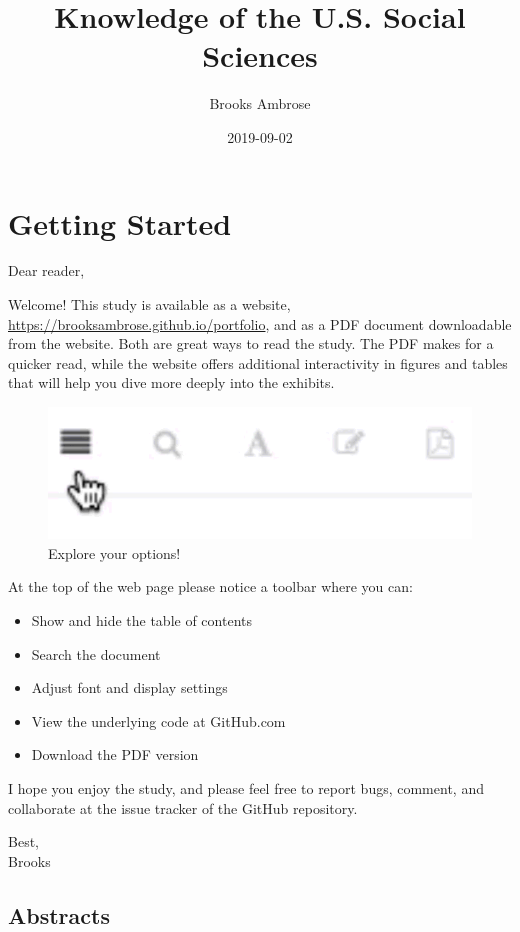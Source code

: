 \documentclass[]{book}
\title{Knowledge of the U.S. Social Sciences}
\author{Brooks Ambrose}
\date{2019-09-02}
\providecommand{\tightlist}{%
  \setlength{\itemsep}{0pt}\setlength{\parskip}{0pt}}
\theoremstyle{definition}
\theoremstyle{definition}
\theoremstyle{definition}
\theoremstyle{remark}
\begin{document}
\maketitle

{
\setcounter{tocdepth}{2}
\tableofcontents
}
\listoftables
\listoffigures
\hypertarget{getting-started}{%
\chapter*{Getting Started}\label{getting-started}}


Dear reader,

Welcome! This study is available as a website,
\url{https://brooksambrose.github.io/portfolio}, and as a PDF document
downloadable from the website. Both are great ways to read the study.
The PDF makes for a quicker read, while the website offers additional
interactivity in figures and tables that will help you dive more deeply
into the exhibits.

\begin{figure}

{\centering \includegraphics[width=0.3\linewidth]{img/toolbar} 

}

\caption{Explore your options!}\label{fig:toolbar}
\end{figure}

At the top of the web page please notice a toolbar where you can:

\begin{itemize}
\tightlist
\item
  Show and hide the table of contents
\item
  Search the document
\item
  Adjust font and display settings
\item
  View the underlying code at GitHub.com
\item
  Download the PDF version
\end{itemize}

I hope you enjoy the study, and please feel free to report bugs,
comment, and collaborate at the issue tracker of the GitHub repository.

Best,\\
Brooks

\hypertarget{abstracts}{%
\section{Abstracts}\label{abstracts}}
\end{document}

